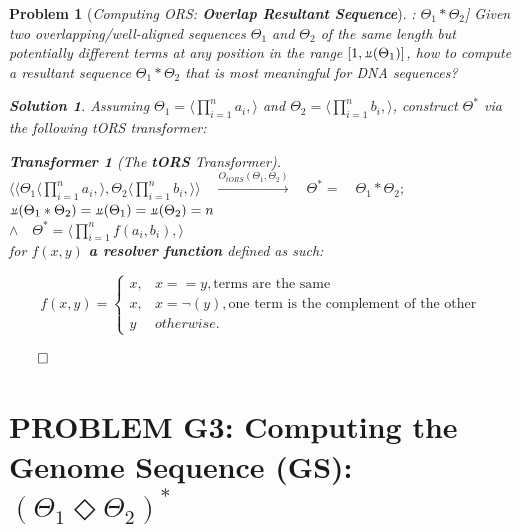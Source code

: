 \documentclass[a4paper, 18pt]{book} %
\newtheorem{transf}{Transformer}
\newtheorem{prob}{Problem}
\newtheorem{soln}{Solution}
\newcommand{\invpi}{\rotatebox[origin=c]{180}{$\pi$}}
\begin{document}
\begin{prob}[\textit{Computing ORS: \textbf{Overlap Resultant Sequence}}]: $\Theta_1 \ast \Theta_2$] 
\label{PROBORS}
Given two overlapping/well-aligned sequences $\Theta_1$ and $\Theta_2$ of the same length but potentially different terms at any position in the range $[1, \invpi(\Theta_1)]$, how to compute a resultant sequence $\Theta_1 \ast \Theta_2$ that is most meaningful for DNA sequences?

\begin{soln}
\label{SOLORS}
Assuming $\Theta_1 = \langle \prod\limits_{i=1}^n a_i, \rangle$ and $\Theta_2 = \langle \prod\limits_{i=1}^n b_i, \rangle$, construct $\Theta^*$ via the following tORS transformer:

\begin{transf}[The \textbf{tORS} Transformer]$ $\\
\label{TRANSFORS}
$\langle\langle \Theta_1\langle \prod\limits_{i=1}^n a_i, \rangle, \Theta_2\langle \prod\limits_{i=1}^n b_i, \rangle \rangle  \quad \xrightarrow{O_{tORS}(\Theta_1,\Theta_2)} \quad \Theta^* = 	 \quad \Theta_1 \ast \Theta_2;$\\
$\invpi(\Theta_1 \ast \Theta_2) = \invpi(\Theta_1) = \invpi(\Theta_2) = n$\\
$\land \quad \Theta^* = \langle \prod\limits_{i=1}^n f(a_i,b_i), \rangle$\\
 for $f(x,y)$ \textbf{a resolver function} defined as such:

\[
f(x,y) = 
\begin{cases}
x, & x == y, \text{terms are the same}\\
x, & x = \lnot(y), \text{one term is the complement of the other}\\
y & otherwise.
\end{cases}
\]

\end{transf}
$\qed$
\end{soln}
\end{prob}

\section{PROBLEM G3: Computing the Genome Sequence (GS): $(\Theta_1 \Diamond \Theta_2)^*$}
\label{SECCOMPGENSEQ}
\end{document}
